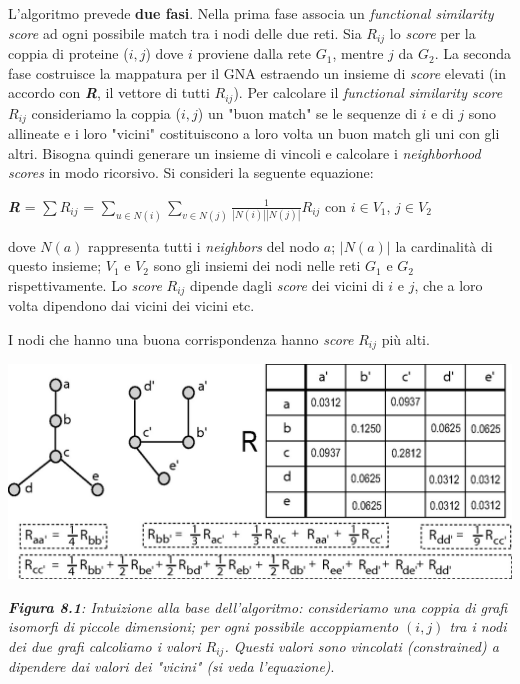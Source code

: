 \documentclass[11pt]{article}
\begin{document}
L'algoritmo prevede \textbf{due fasi}. Nella prima fase associa un \textit{functional similarity score} ad ogni possibile match tra i nodi delle due reti. Sia $R_{ij}$ lo \textit{score} per la coppia di proteine ($i,j$) dove $i$ proviene dalla rete $G_1$, mentre $j$ da $G_2$. La seconda fase costruisce la mappatura per il GNA estraendo un insieme di \textit{score} elevati (in accordo con \textit{\textbf{R}}, il vettore di tutti $R_{ij}$).
Per calcolare il \textit{functional similarity score} $R_{ij}$ consideriamo la coppia ($i,j$) un "buon match" se le sequenze di $i$ e di $j$ sono allineate e i loro "vicini" costituiscono a loro volta un buon match gli uni con gli altri. Bisogna quindi generare un insieme di vincoli e calcolare i \textit{neighborhood scores} in modo ricorsivo. Si consideri la seguente equazione:

\begin{center}
\textit{\textbf{R}} = $\sum R_{ij}$ = $\displaystyle{\sum_{u \in N(i)}} \displaystyle{\sum_{v \in N(j)}\frac{1}{|N(i)||N(j)|} R_{ij}}$ con $i \in V_1$, $j \in V_2$
\end{center}

dove $N(a)$ rappresenta tutti i \textit{neighbors} del nodo $a$; $|N(a)|$ la cardinalità di questo insieme; $V_1$ e $V_2$ sono gli insiemi dei nodi nelle reti $G_1$ e $G_2$ rispettivamente. Lo \textit{score} $R_{ij}$ dipende dagli \textit{score} dei vicini di $i$ e $j$, che a loro volta dipendono dai vicini dei vicini etc.

I nodi che hanno una buona corrispondenza hanno \textit{score} $R_{ij}$ più alti.

\begin{center}
\includegraphics[scale=0.3]{isorank}

\begin{small}\textit{\textbf{Figura 8.1}: Intuizione alla base dell'algoritmo: consideriamo una coppia di grafi isomorfi di piccole dimensioni; per ogni possibile accoppiamento $(i,j)$ tra i nodi dei due grafi calcoliamo i valori $R_{ij}$. Questi valori sono vincolati (\textit{constrained}) a dipendere dai valori dei "vicini" (si veda l'equazione)}.\end{small}
\end{center}
\end{document}
